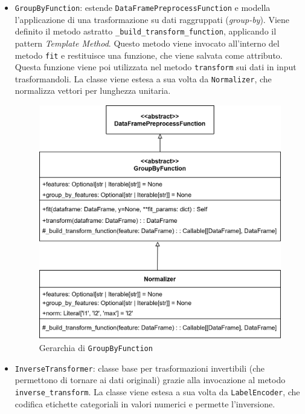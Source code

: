 \begin{itemize}
    \item \texttt{GroupByFunction}: estende \texttt{DataFramePreprocessFunction} e modella l'applicazione di una trasformazione su dati raggruppati (\textit{group-by}). Viene definito il metodo astratto \texttt{\_build\_transform\_function}, applicando il pattern \textit{Template Method}. Questo metodo viene invocato all'interno del metodo \texttt{fit} e restituisce una funzione, che viene salvata come attributo. Questa funzione viene poi utilizzata nel metodo \texttt{transform} sui dati in input trasformandoli. La classe viene estesa a sua volta da \texttt{Normalizer}, che normalizza vettori per lunghezza unitaria.

    \begin{figure}[H]
        \centering
        \includegraphics[scale=0.17]{figures/UML/preprocessing/group_by.png}
        \caption{Gerarchia di \texttt{GroupByFunction}}
    \end{figure}

    \item \texttt{InverseTransformer}: classe base per trasformazioni invertibili (che permettono di tornare ai dati originali) grazie alla invocazione al metodo \\ \texttt{inverse\_transform}. La classe viene estesa a sua volta da \texttt{LabelEncoder}, che codifica etichette categoriali in valori numerici e permette l'inversione.
    

\end{itemize}
